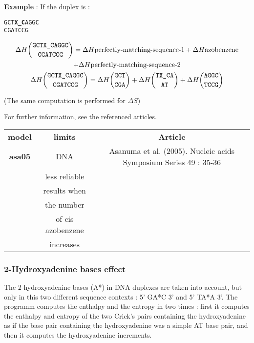\documentclass{article}
\begin{document}
\textbf{Example} :
If the duplex is :
\begin{alltt}
GCT\textbf{X\_C}AGGC
CGATCCG
\end{alltt}
\begin{multline*}
\Delta H {\mbox{\texttt{GCTX\_CAGGC}} \choose \mbox{\texttt{CGATCCG}}} =
\Delta H {\mbox{perfectly-matching-sequence-1}} +
\Delta H {\mbox{azobenzene}} \\ +
\Delta H {\mbox{perfectly-matching-sequence-2}}\\
\Delta H {\mbox{\texttt{GCTX\_CAGGC}} \choose \mbox{\texttt{CGATCCG}}} =
\Delta H {\mbox{\texttt{GCT}} \choose \mbox{\texttt{CGA}}} +
\Delta H {\mbox{\texttt{TX\_CA}} \choose \mbox{\texttt{AT}}} +
\Delta H {\mbox{\texttt{AGGC}} \choose \mbox{\texttt{TCCG}}}\\
\end{multline*}

       (The same computation is performed for $\Delta S$) 
       
For further information, see the referenced articles.

\begin{table}[h]
\begin{tabular}[h]{| c | c | c |}
\textbf{model} & \textbf{limits} & \textbf{Article} \\
\textbf{asa05} & DNA & Asanuma et al. (2005). Nucleic acids Symposium Series 49 : 35-36 \\
 & less reliable & \\
 & results when & \\
 & the number & \\
 & of cis azobenzene & \\
 & increases & \\
\end{tabular}
\end{table}

\subsubsection{2-Hydroxyadenine bases effect}

The 2-hydroxyadenine bases (A*) in DNA duplexes are taken into account, but only in this two different
sequence contexts : 5' GA*C 3' and 5' TA*A 3'. The programm computes the enthalpy and the entropy in two
times : first it computes the enthalpy and entropy of the two Crick's pairs containing the hydroxyadenine
as if the base pair containing the hydroxyadenine was a simple AT base pair, and then it computes the hydroxyadenine
increments.
\end{document}
